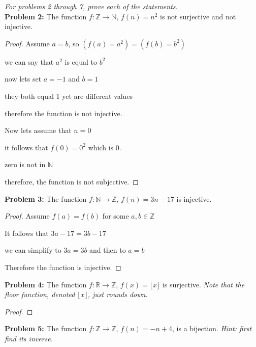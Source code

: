 \documentclass[12pt]{article}
\def\R{\mathbb R} %
\def\Z{\mathbb Z}
\def\N{\mathbb N}
\begin{document}
\textit{For problems 2 through 7, prove each of the statements.} \\ 

{\bf Problem 2:} The function $f:\Z \rightarrow \N$, $f(n)= n^2$ is not surjective and not injective.\\

\begin{proof}

    Assume $a=b$, so $(f(a)=a^2)=(f(b)=b^2)$

    we can say that $a^2$ is equal to $b^2$

    now lets set $a=-1$ and $b=1$

    they both equal 1 yet are different values

    therefore the function is not injective.

    Now lets assume that $n=0$

    it follows that $f(0)=0^2$ which is 0.

    zero is not in $\N$

    therefore, the function is not subjective.

\end{proof}

{\bf Problem 3:} The function $f:\N \rightarrow \Z$, $f(n)= 3n-17$ is injective.\\

\begin{proof}

    Assume $f(a)=f(b)$ for some $a,b\in\Z$

    It follows that $3a-17=3b-17$

    we can simplify to $3a=3b$ and then to $a=b$

    Therefore the function is injective.

\end{proof}

{\bf Problem 4:} The function $f:\R \rightarrow \Z$, $f(x)= \lfloor x \rfloor$ is surjective. \textit{Note that the floor function, denoted $\lfloor x \rfloor$, just rounds down. \\}

\begin{proof}

    

\end{proof}

{\bf Problem 5:} The function $f:\Z \rightarrow \Z$, $f(n)=-n + 4$, is a bijection. \textit{Hint: first find its inverse.} \\
\end{document}
